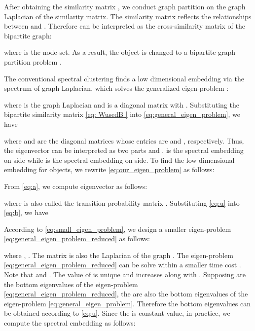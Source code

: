 \documentclass[a4paper,fleqn]{cas-dc}
\begin{document}
After obtaining the similarity matrix , we conduct graph partition on the graph Laplacian of the similarity matrix.
The similarity matrix  reflects the relationships between  and .
Therefore  can be interpreted as the cross-similarity matrix of the bipartite graph:

where  is the node-set.
As a result, the object is changed to a bipartite graph partition problem \cite{dhillon2001co,zha2001bipartite}.

The conventional spectral clustering finds a low dimensional embedding via the spectrum of graph Laplacian, which solves the generalized eigen-problem \cite{shi2000normalized}:

where  is the graph Laplacian and  is a diagonal matrix with .
Substituting the bipartite similarity matrix \eqref{eq: WusedB } into \eqref{eq:general_eigen_problem}, we have

where  and  are the diagonal matrices whose entries are  and , respectively.
Thus, the eigenvector  can be interpreted as two parts  and .
 is the spectral embedding on  side while  is the spectral embedding on  side.
To find the low dimensional embedding for  objects, we rewrite \eqref{eq:our_eigen_problem} as follows:

From \eqref{eq:a}, we compute eigenvector  as follows:

where  is also called the transition probability matrix \cite{li2015superpixel}.
Substituting \eqref{eq:u} into \eqref{eq:b}, we have

According to \eqref{eq:small_eigen_problem}, we design a smaller eigen-problem \eqref{eq:general_eigen_problem_reduced} as follows:

where , .
The matrix  is also the Laplacian of the graph .
The eigen-problem \eqref{eq:general_eigen_problem_reduced} can be solve within a smaller time cost .
Note that  and .
The value of  is unique and  increases along with .
Supposing  are the bottom  eigenvalues of the eigen-problem \eqref{eq:general_eigen_problem_reduced}, the  are also the bottom  eigenvalues of the eigen-problem \eqref{eq:general_eigen_problem}.
Therefore the bottom  eigenvalues can be obtained according to \eqref{eq:u}.
Since the  is constant value, in practice, we compute the spectral embedding  as follows:
\end{document}

